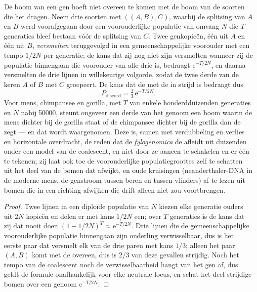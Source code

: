 \begin{proposition}\label{prop:b3:molecular-evolution:ils}
De boom van een gen hoeft niet overeen te komen met de boom van de
soorten die het dragen. Neem drie soorten met  $((A,B),C)$,
waarbij de splitsing van $A$ en $B$ werd voorafgegaan door een
voorouderlijke populatie van omvang $N$ die $T$ generaties bleef
bestaan vóór de splitsing van $C$. Twee genkopieën, één uit $A$ en één
uit $B$, \emph{versmelten} teruggevolgd in een gemeenschappelijke
voorouder met een tempo $1/2N$ per generatie; de kans dat zij nog niet
zijn versmolten wanneer zij de populatie binnengaan die voorouder van
alle drie is, bedraagt $\mathrm{e}^{-T/2N}$, en daarna versmelten de
drie lijnen in willekeurige volgorde, zodat de  twee derde van
de keren $A$ of $B$ met $C$ groepeert. De kans dat de  met de
 in strijd is bedraagt dus
\[
P_{\text{discord}} = \tfrac{2}{3}\,\mathrm{e}^{-T/2N} .
\]
Voor mens, chimpansee en gorilla, met $T$ van enkele honderdduizenden
generaties en $N$ nabij \num{50000}, steunt ongeveer een derde van het
genoom een boom waarin de mens dichter bij de gorilla staat of de
chimpansee dichter bij de gorilla dan de  zegt --- en dat
wordt waargenomen. Deze \emph{} is,
samen met verdubbeling en verlies en horizontale overdracht, de reden
dat de \emph{fylogenomica} de  afleidt uit duizenden 
onder een model van de coalescent, en niet door ze aaneen te schakelen
en er één te tekenen; zij laat ook toe de voorouderlijke
populatiegroottes zelf te schatten uit het deel van de bomen dat
afwijkt, en oude kruisingen (neanderthaler-DNA in de moderne mens, de
genstroom tussen beren en tussen vlinders) af te lezen uit bomen die in
een richting afwijken die drift alleen niet zou voortbrengen.
\end{proposition}
\begin{proof}
Twee lijnen in een diploïde populatie van $N$ kiezen elke generatie
ouders uit $2N$ kopieën en delen er met kans $1/2N$ een; over $T$
generaties is de kans dat zij dat nooit doen $(1 - 1/2N)^{T} \approx
\mathrm{e}^{-T/2N}$. Drie lijnen die de gemeenschappelijke
voorouderlijke populatie binnengaan zijn onderling verwisselbaar, dus
is het eerste paar dat versmelt elk van de drie paren met kans $1/3$;
alleen het paar $(A,B)$ komt met de  overeen, dus is $2/3$ van
deze gevallen strijdig. Noch het tempo van de coalescent noch de
verwisselbaarheid hangt van het gen af, dus geldt de formule
onafhankelijk voor elke neutrale locus, en schat het deel strijdige
bomen over een genoom $\mathrm{e}^{-T/2N}$.
\end{proof}

